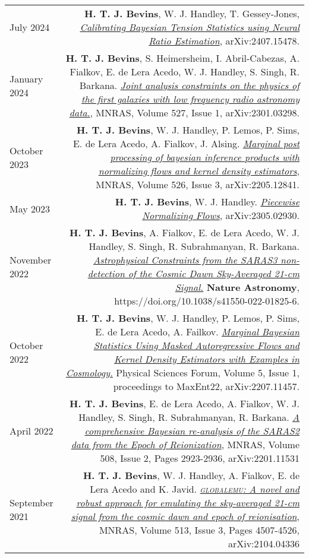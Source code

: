 \documentclass{article}
\begin{document}
\begin{tabular}{L!{\vrule}R}
    July 2024 & \textbf{H. T. J. Bevins}, W. J. Handley, T. Gessey-Jones, \href{https://arxiv.org/abs/2407.15478}{\textit{Calibrating Bayesian Tension Statistics using Neural Ratio Estimation}}, arXiv:2407.15478. \\
    January 2024 & \textbf{H. T. J. Bevins}, S. Heimersheim, I. Abril-Cabezas, A. Fialkov, E. de Lera Acedo, W. J. Handley, S. Singh, R. Barkana. \href{https://academic.oup.com/mnras/article/527/1/813/7326010?utm_source=advanceaccess&utm_campaign=mnras&utm_medium=email}{\textit{Joint analysis constraints on the physics of the first galaxies with low frequency radio astronomy data.}}, MNRAS, Volume 527, Issue 1, arXiv:2301.03298. \\
    October 2023 & \textbf{H. T. J. Bevins}, W. J. Handley, P. Lemos, P. Sims, E. de Lera Acedo, A. Fialkov, J. Alsing. \href{https://arxiv.org/abs/2205.12841}{\textit{Marginal post processing of bayesian inference products with normalizing flows and kernel density estimators}}, MNRAS, Volume 526, Issue 3, arXiv:2205.12841. \\
    May 2023 & \textbf{H. T. J. Bevins}, W. J. Handley. \href{https://arxiv.org/abs/2305.02930}{\textit{Piecewise Normalizing Flows}}, arXiv:2305.02930. \\
    November 2022 & \textbf{H. T. J. Bevins}, A. Fialkov, E. de Lera Acedo, W. J. Handley, S. Singh, R. Subrahmanyan, R. Barkana. \href{https://www.nature.com/articles/s41550-022-01825-6}{\textit{Astrophysical Constraints from the SARAS3 non-detection of the Cosmic Dawn Sky-Averaged 21-cm Signal.}} \textbf{Nature Astronomy}, https://doi.org/10.1038/s41550-022-01825-6.\\
	October 2022 & \textbf{H. T. J. Bevins}, W. J. Handley, P. Lemos, P. Sims, E. de Lera Acedo, A. Failkov. \href{https://www.mdpi.com/2673-9984/5/1/1#abstract}{\textit{Marginal Bayesian Statistics Using Masked Autoregressive Flows and Kernel Density Estimators with Examples in Cosmology.}} Physical Sciences Forum, Volume 5, Issue 1, proceedings to MaxEnt22, arXiv:2207.11457. \\
	April 2022 & \textbf{H. T. J. Bevins}, E. de Lera Acedo, A. Fialkov, W. J. Handley, S. Singh, R. Subrahmanyan, R. Barkana. \href{https://doi.org/10.1093/mnras/stac1158}{\textit{A comprehensive Bayesian re-analysis of the SARAS2 data from the Epoch of Reionization}}, MNRAS, Volume 508, Issue 2, Pages 2923-2936, arXiv:2201.11531\\
	September 2021 & \textbf{H. T. J. Bevins}, W. J. Handley, A. Fialkov, E. de Lera Acedo and K. Javid. \href{https://doi.org/10.1093/mnras/stab2737}{\textit{\textsc{globalemu}: A novel and robust approach for emulating the sky-averaged 21-cm signal from the cosmic dawn and epoch of reionisation}}, MNRAS, Volume 513, Issue 3, Pages 4507-4526, arXiv:2104.04336 \\

\end{tabular}
\end{document}
